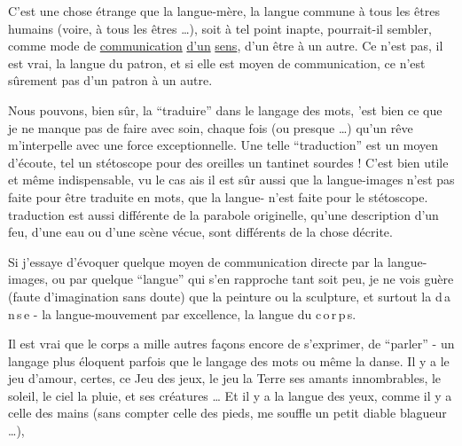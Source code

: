 
C'est une chose étrange que la langue-mère, la langue commune à tous les êtres humains (voire, à tous les êtres \ldots),  soit à tel point inapte, pourrait-il sembler, comme mode de \uline{communication} \uline{d'un} \uline{sens}, d'un être à un autre. Ce n'est pas, il est vrai, la langue du patron, et si elle est moyen de communication, ce n'est sûrement pas d'un patron à un autre.

Nous pouvons, bien sûr, la ``traduire'' dans le langage des mots,  'est bien ce que je ne manque pas de faire avec   soin, chaque fois (ou presque \ldots) qu'un rêve  m'interpelle avec une force exceptionnelle. Une telle ``traduction'' est un moyen d'écoute, tel un stétoscope pour des oreilles un tantinet sourdes !  C'est bien utile et même indispensable, vu le cas ais il est sûr aussi que la langue-images n'est pas  faite pour être traduite en mots,  que la langue- n'est faite pour le stétoscope.  traduction est aussi différente de la parabole originelle, qu'une description d'un feu, d'une eau ou d'une scène vécue, sont différents de la chose décrite.

Si j'essaye d'évoquer quelque moyen de communication directe par la langue-images, ou par quelque  ``langue'' qui s'en rapproche tant soit peu, je ne vois guère (faute d'imagination sans doute) que la peinture ou la sculpture, et surtout la \mbox{d\,a\,n\,s\,e} - la langue-mouvement par excellence, la langue du \mbox{c\,o\,r\,p\,s}.

Il est vrai que le corps a mille autres façons encore de s'exprimer, de ``parler'' -  un langage plus éloquent parfois que le langage des mots ou même la danse. Il y a le jeu d'amour, certes, ce Jeu des jeux, le jeu  la Terre  ses amants innombrables,  le soleil,  le ciel  la pluie, et   ses créatures \ldots{} Et il y a la langue des yeux, comme il y a celle des mains (sans compter celle des pieds, me souffle un petit diable blagueur \ldots),

